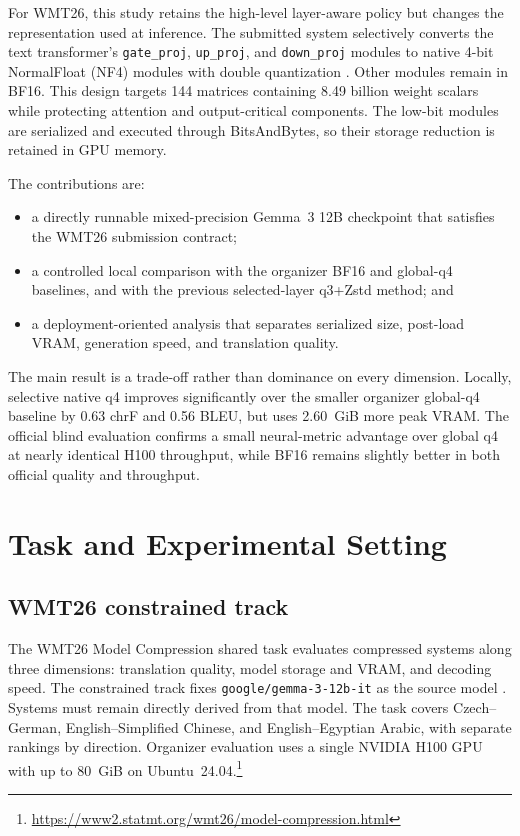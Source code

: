 \documentclass[11pt]{article}
\begin{document}
For WMT26, this study retains the high-level layer-aware policy but changes the representation used at inference. The submitted system selectively converts the text transformer's \texttt{gate\_proj}, \texttt{up\_proj}, and \texttt{down\_proj} modules to native 4-bit NormalFloat (NF4) modules with double quantization \citep{dettmers-etal-2023-qlora}. Other modules remain in BF16. This design targets 144 matrices containing 8.49 billion weight scalars while protecting attention and output-critical components. The low-bit modules are serialized and executed through BitsAndBytes, so their storage reduction is retained in GPU memory.

The contributions are:
\begin{itemize}
    \item a directly runnable mixed-precision Gemma~3 12B checkpoint that satisfies the WMT26 submission contract;
    \item a controlled local comparison with the organizer BF16 and global-q4 baselines, and with the previous selected-layer q3+Zstd method; and
    \item a deployment-oriented analysis that separates serialized size, post-load VRAM, generation speed, and translation quality.
\end{itemize}

The main result is a trade-off rather than dominance on every dimension. Locally, selective native q4 improves significantly over the smaller organizer global-q4 baseline by 0.63 chrF and 0.56 BLEU, but uses 2.60~GiB more peak VRAM. The official blind evaluation confirms a small neural-metric advantage over global q4 at nearly identical H100 throughput, while BF16 remains slightly better in both official quality and throughput.

\section{Task and Experimental Setting}

\subsection{WMT26 constrained track}

The WMT26 Model Compression shared task evaluates compressed systems along three dimensions: translation quality, model storage and VRAM, and decoding speed. The constrained track fixes \texttt{google/gemma-3-12b-it} as the source model \citep{gemma-team-2025}. Systems must remain directly derived from that model. The task covers Czech--German, English--Simplified Chinese, and English--Egyptian Arabic, with separate rankings by direction. Organizer evaluation uses a single NVIDIA H100 GPU with up to 80~GiB on Ubuntu~24.04.\footnote{\url{https://www2.statmt.org/wmt26/model-compression.html}}
\end{document}
